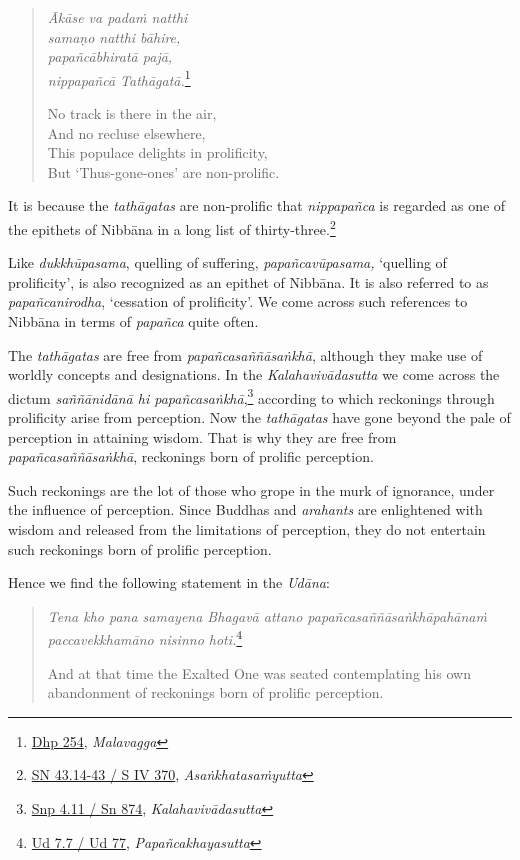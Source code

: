 \begin{quote}
\emph{Ākāse va padaṁ natthi}\\
\emph{samaṇo natthi bāhire,}\\
\emph{papañcābhiratā pajā,}\\
\emph{nippapañcā Tathāgatā.}\footnote{\href{https://suttacentral.net/dhp235-255/pli/ms}{Dhp 254}, \emph{Malavagga}}

No track is there in the air,\\
And no recluse elsewhere,\\
This populace delights in prolificity,\\
But `Thus-gone-ones' are non-prolific.
\end{quote}

It is because the \emph{tathāgatas} are non-prolific that \emph{nippapañca} is regarded as one of the epithets of Nibbāna in a long list of thirty-three.\footnote{\href{https://suttacentral.net/sn43.14-43/pli/ms}{SN 43.14-43 / S IV 370}, \emph{Asaṅkhatasaṁyutta}}

Like \emph{dukkhūpasama}, quelling of suffering, \emph{papañcavūpasama,} `quelling of prolificity', is also recognized as an epithet of Nibbāna. It is also referred to as \emph{papañcanirodha}, `cessation of prolificity'. We come across such references to Nibbāna in terms of \emph{papañca} quite often.

The \emph{tathāgatas} are free from \emph{papañcasaññāsaṅkhā}, although they make use of worldly concepts and designations. In the \emph{Kalahavivādasutta} we come across the dictum \emph{saññānidānā hi papañcasaṅkhā},\footnote{\href{https://suttacentral.net/snp4.11/pli/ms}{Snp 4.11 / Sn 874}, \emph{Kalahavivādasutta}} according to which reckonings through prolificity arise from perception. Now the \emph{tathāgatas} have gone beyond the pale of perception in attaining wisdom. That is why they are free from \emph{papañcasaññāsaṅkhā}, reckonings born of prolific perception.

Such reckonings are the lot of those who grope in the murk of ignorance, under the influence of perception. Since Buddhas and \emph{arahants} are enlightened with wisdom and released from the limitations of perception, they do not entertain such reckonings born of prolific perception.

\clearpage

Hence we find the following statement in the \emph{Udāna}:

\begin{quote}
\emph{Tena kho pana samayena Bhagavā attano papañcasaññāsaṅkhāpahānaṁ paccavekkhamāno nisinno hoti.}\footnote{\href{https://suttacentral.net/ud7.7/pli/ms}{Ud 7.7 / Ud 77}, \emph{Papañcakhayasutta}}

And at that time the Exalted One was seated contemplating his own abandonment of reckonings born of prolific perception.
\end{quote}

